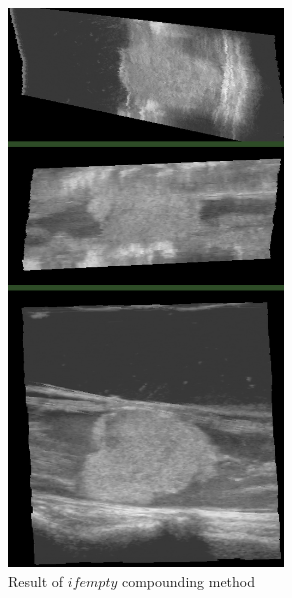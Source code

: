 \begin{figure}
\begin{minipage}[b]{0.49\textwidth}
	\centering
	\includegraphics[width=0.652\textwidth]{graphics/large_ifempty.png}
	\caption{Result of $ifempty$ compounding method}
	\label{fig:large_ifempty}
\end{minipage}
\hspace{0.02\textwidth}
\begin{minipage}[b]{0.49\textwidth}
	\centering

\end{minipage}
\end{figure}
